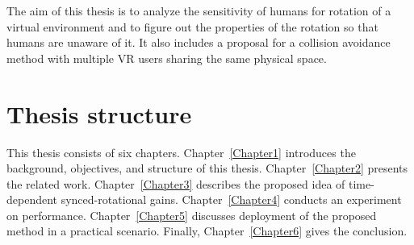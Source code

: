 The aim of this thesis is to analyze the sensitivity of humans for rotation of a virtual environment and to figure out the properties of the rotation so that humans are unaware of it. It also includes a proposal for a collision avoidance method with multiple VR users sharing the same physical space.

\section{Thesis structure}
This thesis consists of six chapters. Chapter~\ref{Chapter1}  introduces the background, objectives, and structure of this thesis. Chapter~\ref{Chapter2} presents the related work. Chapter~\ref{Chapter3} describes the proposed idea of time-dependent synced-rotational gains. Chapter~\ref{Chapter4} conducts an experiment on performance. Chapter~\ref{Chapter5} discusses deployment of the proposed method in a practical scenario. Finally, Chapter~\ref{Chapter6} gives the conclusion.





